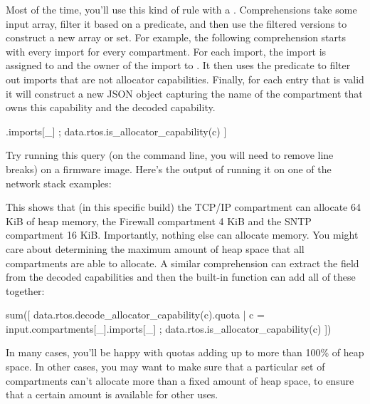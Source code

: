 {Most of the time, you'll use this kind of rule with a .
Comprehensions take some input array, filter it based on a predicate, and then use the filtered versions to construct a new array or set.
For example, the following comprehension starts with every import for every compartment.
For each import, the import is assigned to  and the owner of the import to .
It then uses the  predicate to filter out imports that are not allocator capabilities.
Finally, for each entry that is valid it will construct a new JSON object capturing the name of the compartment that owns this capability and the decoded capability.

\begin{regosnippet}
[
	{
		"owner": owner, 
		"capability": data.rtos.decode_allocator_capability(c)
	\} |
	c = input.compartments[owner].imports[_] ;
	data.rtos.is_allocator_capability(c)
]
\end{regosnippet}

Try running this query (on the command line, you will need to remove line breaks) on a firmware image.
Here's the output of running it on one of the network stack examples:

\begin{jsonsnippet}
[
  {
    "capability": {
      "quota": 4096
    \},
    "owner": "Firewall"
  \},
  {
    "capability": {
      "quota": 16384
    \},
    "owner": "SNTP"
  \},
  {
    "capability": {
      "quota": 65536
    \},
    "owner": "TCPIP"
  \}
]
\end{jsonsnippet}

This shows that (in this specific build) the TCP/IP compartment can allocate 64 KiB of heap memory, the Firewall compartment 4 KiB and the SNTP compartment 16 KiB.
Importantly, nothing else can allocate memory.
You might care about determining the maximum amount of heap space that all compartments are able to allocate.
A similar comprehension can extract the  field from the decoded capabilities and then the built-in  function can add all of these together:

\begin{regosnippet}
sum([ data.rtos.decode_allocator_capability(c).quota |
    c = input.compartments[_].imports[_] ;
    data.rtos.is_allocator_capability(c) ])
\end{regosnippet}

In many cases, you'll be happy with quotas adding up to more than 100\% of heap space.
In other cases, you may want to make sure that a particular set of compartments can't allocate more than a fixed amount of heap space, to ensure that a certain amount is available for other uses.

}
